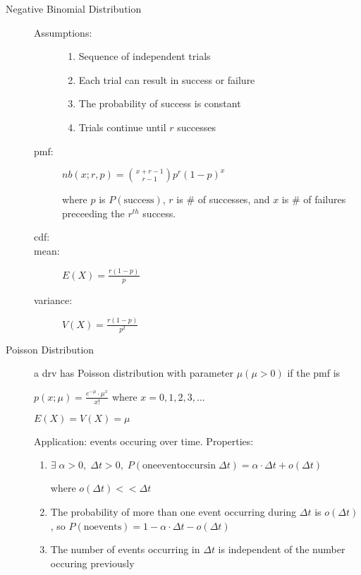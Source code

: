 \documentclass[12pt]{letter}
\begin{document}
\begin{multicols}{2}
\begin{description}
  \item[Negative Binomial Distribution]
    \begin{description}
    \item[Assumptions:]
      \begin{enumerate}
      \item Sequence of independent trials
      \item Each trial can result in success or failure
      \item The probability of success is constant
      \item Trials continue until $r$ successes
      \end{enumerate}
    \item[pmf:] $nb(x; r, p) = {x + r - 1 \choose r-1} p^r(1-p)^x$

      where $p$ is $P(\mathrm{success})$, $r$ is \# of successes, and $x$ is \# of failures preceeding the $r^\mathit{th}$ success.
    \item[cdf:]
    \item[mean:] $E(X) = \frac{r(1-p)}{p}$
    \item[variance:] $V(X) = \frac{r(1-p)}{p^2}$
    \end{description}
    \pagebreak
  \item[Poisson Distribution]
    a drv has Poisson distribution with parameter $\mu (\mu > 0)$ if the pmf is

    $p(x; \mu) = \frac{e^{-\mu}\cdot \mu^x}{x!}$ where $x = 0,1,2,3,\ldots$

    $E(X) = V(X) = \mu$
    
    Application: events occuring over time. Properties:
    
    \begin{enumerate}
    \item $\exists\;\alpha > 0,\;\Delta t > 0,\; P(\mathrm{one event occurs in}\;\Delta t) = \alpha \cdot \Delta t + o(\Delta t)$

      where $o(\Delta t) << \Delta t$

    \item The probability of more than one event occurring during $\Delta t$ is $o(\Delta t)$, 
      so $P(\mathrm{no events}) = 1 - \alpha \cdot \Delta t - o(\Delta t)$

    \item The number of events occurring in $\Delta t$ is independent of the number occuring previously
    \end{enumerate}


\end{description}
\end{multicols}
\end{document}
